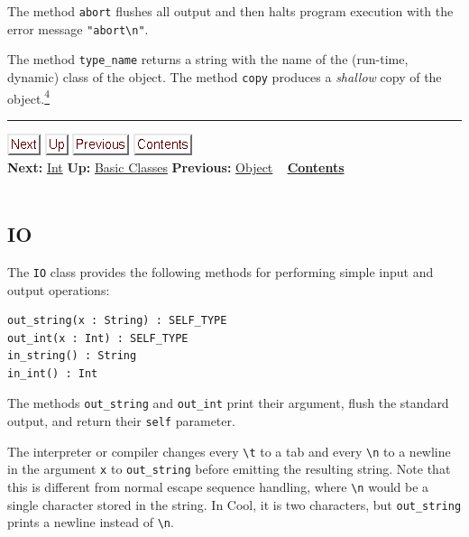 \documentclass[]{article}
\begin{document}
The method \texttt{abort} flushes all output and then halts program
execution with the error message \texttt{"abort\textbackslash{}n"}.

The method \texttt{type\_name} returns a string with the name of the
(run-time, dynamic) class of the object. The method \texttt{copy}
produces a \emph{shallow} copy of the
object.\href{footnode.html\#foot715}{\textsuperscript{4}}

\begin{center}\rule{3in}{0.4pt}\end{center}

\href{node29.html}{\includegraphics{next.png}}
\href{node26.html}{\includegraphics{up.png}}
\href{node27.html}{\includegraphics{prev.png}}
\href{node1.html}{\includegraphics{contents.png}} \\ \textbf{Next:}
\href{node29.html}{Int} \textbf{Up:} \href{node26.html}{Basic Classes}
\textbf{Previous:} \href{node27.html}{Object} ~
\textbf{\href{node1.html}{Contents}} \\ \\

\subsection{IO}

The \texttt{IO} class provides the following methods for performing
simple input and output operations:

\begin{verbatim}
out_string(x : String) : SELF_TYPE
out_int(x : Int) : SELF_TYPE
in_string() : String
in_int() : Int
\end{verbatim}

The methods \texttt{out\_string} and \texttt{out\_int} print their
argument, flush the standard output, and return their \texttt{self}
parameter.

The interpreter or compiler changes every \texttt{\textbackslash{}t} to
a tab and every \texttt{\textbackslash{}n} to a newline in the argument
\texttt{x} to \texttt{out\_string} before emitting the resulting string.
Note that this is different from normal escape sequence handling, where
\texttt{\textbackslash{}n} would be a single character stored in the
string. In Cool, it is two characters, but \texttt{out\_string} prints a
newline instead of \texttt{\textbackslash{}n}.
\end{document}
